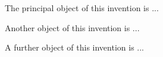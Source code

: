 



The principal object of this invention is 
	...




Another object of this invention is 
	...




A further object of this invention is
	...








